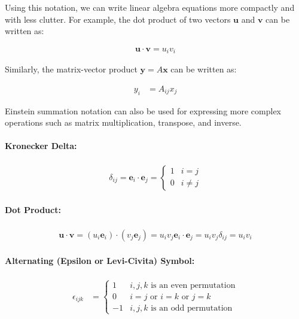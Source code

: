 Using this notation, we can write linear algebra equations more compactly and with less clutter. For example, the dot product of two vectors $\mathbf{u}$ and $\mathbf{v}$ can be written as:

\begin{align}
\mathbf{u} \cdot \mathbf{v} = u_i v_i
\end{align}

Similarly, the matrix-vector product $\mathbf{y} = A \mathbf{x}$ can be written as:

\begin{align}
y_i &= A_{ij} x_j
\end{align}

Einstein summation notation can also be used for expressing more complex operations such as matrix multiplication, transpose, and inverse.

\paragraph{Kronecker Delta:}
\begin{align}
    \delta_{ij} = \mathbf{e}_i \cdot \mathbf{e}_j = 
    \begin{cases}
        1 & i=j \\
        0 & i\neq j
    \end{cases}
\end{align}

\paragraph{Dot Product:}
\begin{align}
\mathbf{u} \cdot \mathbf{v} = (u_i \mathbf{e}_i) \cdot (v_j \mathbf{e}_j) = u_i v_j \mathbf{e}_i \cdot \mathbf{e}_j = u_i v_j \delta_{ij} = u_i v_i
\end{align}

\paragraph{Alternating (Epsilon or Levi-Civita) Symbol:}
\begin{align}
    \epsilon_{ijk} &= \begin{cases}
    1 & i,j,k \text{ is an even permutation}\\
    0 & i=j \text{ or } i=k \text{ or } j=k\\
    -1 & i,j,k \text{ is an odd permutation}
\end{cases}
\end{align}

